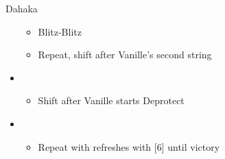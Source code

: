 \begin{battle}[1:30]{Dahaka}
\begin{itemize}
			      \begin{itemize}
				      \item Blitz-Blitz
				      \item Repeat, shift after Vanille's second string
			      \end{itemize}
			\item \fifth
			      \begin{itemize}
				      \item Shift after Vanille starts Deprotect
			      \end{itemize}
			\item \fourth
			      \begin{itemize}
				      \item Repeat with refreshes with [6] until victory
			      \end{itemize}
		\end{itemize}
	\end{battle}

